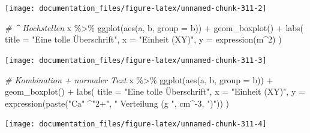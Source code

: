 \documentclass[
]{article}
\newenvironment{Shaded}{\begin{snugshade}}{\end{snugshade}}
\newcommand{\AttributeTok}[1]{\textcolor[rgb]{0.77,0.63,0.00}{#1}}
\newcommand{\CommentTok}[1]{\textcolor[rgb]{0.56,0.35,0.01}{\textit{#1}}}
\newcommand{\DecValTok}[1]{\textcolor[rgb]{0.00,0.00,0.81}{#1}}
\newcommand{\FunctionTok}[1]{\textcolor[rgb]{0.00,0.00,0.00}{#1}}
\newcommand{\NormalTok}[1]{#1}
\newcommand{\SpecialCharTok}[1]{\textcolor[rgb]{0.00,0.00,0.00}{#1}}
\newcommand{\StringTok}[1]{\textcolor[rgb]{0.31,0.60,0.02}{#1}}
\begin{document}
\begin{center}\texttt{[image: documentation\_files/figure-latex/unnamed-chunk-311-2]} \end{center}

\begin{Shaded}
\begin{Highlighting}[]

\CommentTok{\# \^{} Hochstellen}
\NormalTok{x }\SpecialCharTok{\%\textgreater{}\%}
  \FunctionTok{ggplot}\NormalTok{(}\FunctionTok{aes}\NormalTok{(a, b, }\AttributeTok{group =}\NormalTok{ b)) }\SpecialCharTok{+}
  \FunctionTok{geom\_boxplot}\NormalTok{() }\SpecialCharTok{+}
  \FunctionTok{labs}\NormalTok{(}
    \AttributeTok{title =} \StringTok{"Eine tolle Überschrift"}\NormalTok{,}
    \AttributeTok{x =} \StringTok{"Einheit (XY)"}\NormalTok{,}
    \AttributeTok{y =} \FunctionTok{expression}\NormalTok{(m}\SpecialCharTok{\^{}}\DecValTok{2}\NormalTok{)}
\NormalTok{  )}
\end{Highlighting}
\end{Shaded}

\begin{center}\texttt{[image: documentation\_files/figure-latex/unnamed-chunk-311-3]} \end{center}

\begin{Shaded}
\begin{Highlighting}[]

\CommentTok{\# Kombination + normaler Text}
\NormalTok{x }\SpecialCharTok{\%\textgreater{}\%}
  \FunctionTok{ggplot}\NormalTok{(}\FunctionTok{aes}\NormalTok{(a, b, }\AttributeTok{group =}\NormalTok{ b)) }\SpecialCharTok{+}
  \FunctionTok{geom\_boxplot}\NormalTok{() }\SpecialCharTok{+}
  \FunctionTok{labs}\NormalTok{(}
    \AttributeTok{title =} \StringTok{"Eine tolle Überschrift"}\NormalTok{,}
    \AttributeTok{x =} \StringTok{"Einheit (XY)"}\NormalTok{,}
    \AttributeTok{y =} \FunctionTok{expression}\NormalTok{(}\FunctionTok{paste}\NormalTok{(}\StringTok{"Ca"} \SpecialCharTok{\^{}}\StringTok{"2+"}\NormalTok{, }\StringTok{" Verteilung (g "}\NormalTok{, cm}\SpecialCharTok{\^{}{-}}\DecValTok{3}\NormalTok{, }\StringTok{")"}\NormalTok{))}
\NormalTok{  )}
\end{Highlighting}
\end{Shaded}

\begin{center}\texttt{[image: documentation\_files/figure-latex/unnamed-chunk-311-4]} \end{center}
\end{document}
